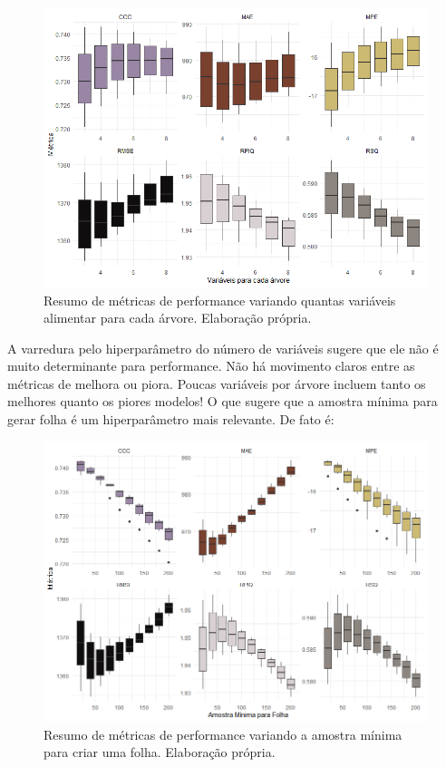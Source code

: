 \begin{figure}[H]
    \centering
    \includegraphics[scale = .72]{imagens/cross_v_mtry.png}
    \caption{Resumo de métricas de performance variando quantas variáveis alimentar para cada árvore. Elaboração própria.}
\end{figure}

A varredura pelo hiperparâmetro do número de variáveis sugere que ele não é muito determinante para performance. Não há movimento claros entre as métricas de melhora ou piora. Poucas variáveis por árvore incluem tanto os melhores quanto os piores modelos! O que sugere que a amostra mínima para gerar folha é um hiperparâmetro mais relevante. De fato é:


\begin{figure}[H]
    \centering
    \includegraphics[scale = .70]{imagens/crossv_min.png}
    \caption{Resumo de métricas de performance variando a amostra mínima para criar uma folha. Elaboração própria.}
\end{figure}

